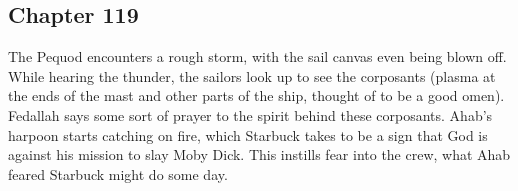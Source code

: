 \subsection{Chapter 119}

The Pequod encounters a rough storm, with the sail canvas even being blown off.
While hearing the thunder, the sailors look up to see the corposants (plasma at
the ends of the mast and other parts of the ship, thought of to be a good
omen). Fedallah says some sort of prayer to the spirit behind these corposants.
Ahab's harpoon starts catching on fire, which Starbuck takes to be a sign that
God is against his mission to slay Moby Dick. This instills fear into the crew,
what Ahab feared Starbuck might do some day.
